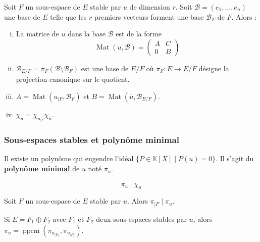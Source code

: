 	
	\begin{proposition}
		Soit $F$ un sous-espace de $E$ stable par $u$ de dimension $r$. Soit $\mathcal{B} = (e_1, \dots, e_n)$ une base de $E$ telle que les $r$ premiers vecteurs forment une base $\mathcal{B}_F$ de $F$. Alors :
		\begin{enumerate}[(i)]
			\item La matrice de $u$ dans la base $\mathcal{B}$ est de la forme
			\[ \operatorname{Mat}(u, \mathcal{B}) = \begin{pmatrix} A & C \\ 0 & B \end{pmatrix} \]
			\item $\mathcal{B}_{E/F} = \pi_F(\mathcal{B} \setminus \mathcal{B}_F)$ est une base de $E/F$ où $\pi_F : E \rightarrow E/F$ désigne la projection canonique sur le quotient.
			\item $A = \operatorname{Mat}(u_{|F}, \mathcal{B}_F)$ et $B = \operatorname{Mat}(\overline{u}, \mathcal{B}_{E/F})$.
			\item $\chi_u = \chi_{u_{|F}} \chi_{\overline{u}}$.
		\end{enumerate}
	\end{proposition}
	
	\newpage
	
	\subsubsection{Sous-espaces stables et polynôme minimal}
	
	
	\begin{proposition}
		Il existe un polynôme qui engendre l'idéal $\{ P \in \mathbb{K}[X] \mid P(u) = 0 \}$. Il s'agit du \textbf{polynôme minimal} de $u$ noté $\pi_u$.
	\end{proposition}
	
	\begin{theorem}
		\[ \pi_u \mid \chi_u \]
	\end{theorem}
	
	\begin{proposition}
		Soit $F$ un sous-espace de $E$ stable par $u$. Alors $\pi_{|F} \mid \pi_u$.
	\end{proposition}
	
	\begin{proposition}
		Si $E = F_1 \oplus F_2$ avec $F_1$ et $F_2$ deux sous-espaces stables par $u$, alors $\pi_u = \operatorname{ppcm}(\pi_{u_{|F_1}}, \pi_{u_{|F_2}})$.
	\end{proposition}
	
